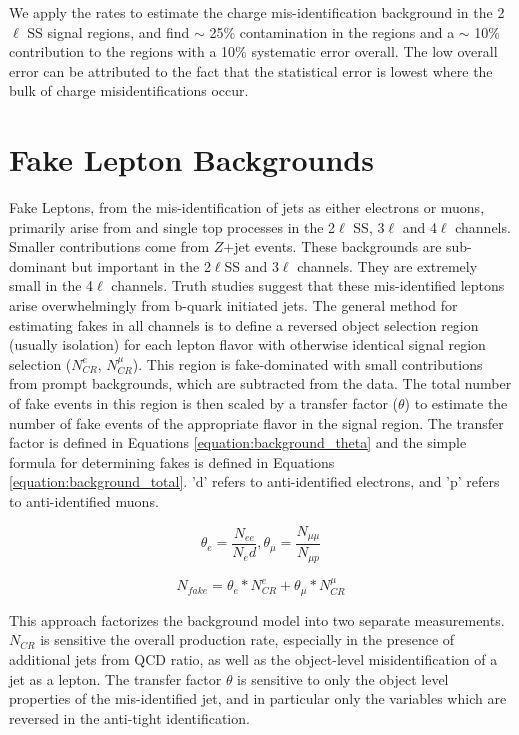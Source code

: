 We apply the rates to estimate the charge mis-identification background in the 2$\ell$ SS signal regions, and find  $\sim$ 25\% contamination in the \ee regions and a $\sim$ 10\% contribution to the \emu regions with a 10\% systematic error overall. The low overall error can be attributed to the fact that the statistical error is lowest where the bulk of charge misidentifications occur.  


\section{Fake Lepton Backgrounds}
\label{section:fakes}
Fake Leptons, from the mis-identification of jets as either electrons or muons, primarily arise from \ttbar and single top processes in the 2$\ell$ SS, 3$\ell$ and 4$\ell$ channels. Smaller contributions come from $Z$+jet events. These backgrounds are sub-dominant but important in the 2$\ell$SS and 3$\ell$ channels. They are extremely small in the 4$\ell$ channels. Truth studies suggest that these mis-identified leptons arise overwhelmingly from b-quark initiated jets. The general method for estimating fakes in all channels is to define a reversed object selection region (usually isolation) for each lepton flavor with otherwise identical signal region selection ($N^e_{CR}$, $N^{\mu}_{CR}$). This region is fake-dominated with small contributions from prompt backgrounds, which are subtracted from the data. The total number of fake events in this region is then scaled by a transfer factor ($\theta$) to estimate the number of fake events of the appropriate flavor in the signal region. The transfer factor is defined in Equations \ref{equation:background_theta} and the simple formula for determining fakes is defined in Equations \ref{equation:background_total}.  'd' refers to anti-identified electrons, and 'p' refers to anti-identified muons.  


\begin{equation}
\theta_e = \frac{N_{ee}}{N_ed}, \theta_{\mu} = \frac{N_{\mu\mu}}{N_{\mu p}}
\label{equation:background_theta}
\end{equation}

\begin{equation}
N_{fake} = \theta_e * N^e_{CR} + \theta_{\mu} * N^{\mu}_{CR}   
\label{equation:background_total}
\end{equation}


This approach factorizes the background model into two separate measurements. $N_{CR}$ is sensitive the overall \ttbar production rate, especially in the presence of additional jets from QCD ratio, as well as the object-level misidentification of a jet as a lepton. The transfer factor $\theta$ is sensitive to only the object level properties of the mis-identified jet, and in particular only the variables which are reversed in the anti-tight identification. 

